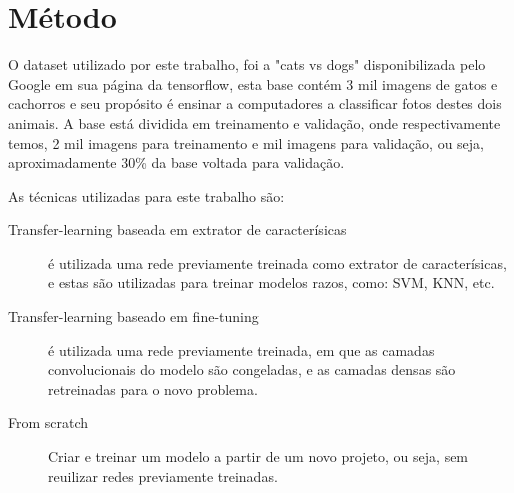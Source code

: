 \section{Método}

O dataset utilizado por este trabalho, foi a "cats vs dogs" disponibilizada pelo Google em sua página da tensorflow, esta base contém 3 mil imagens de gatos e cachorros e seu propósito é ensinar a computadores a classificar fotos destes dois animais.
A base está dividida em treinamento e validação, onde respectivamente temos, 2 mil imagens para treinamento e mil imagens para validação, ou seja, aproximadamente 30\% da base voltada para validação.

As técnicas utilizadas para este trabalho são:

 \begin{description}
	\item[Transfer-learning baseada em extrator de caracterísicas] é utilizada uma rede previamente treinada como extrator de caracterísicas, e estas são utilizadas para treinar modelos razos, como: SVM, KNN, etc.
	\item[Transfer-learning baseado em fine-tuning] é utilizada uma rede previamente treinada, em que as camadas convolucionais do modelo são congeladas, e as camadas densas são retreinadas para o novo problema.
	\item[From scratch] Criar e treinar um modelo a partir de um novo projeto, ou seja, sem reuilizar redes previamente treinadas.
\end{description}



